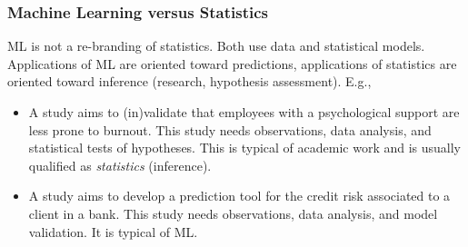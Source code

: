 \begin{frame}
\frametitle{Machine Learning versus Statistics}
ML is not a re-branding of statistics. Both use data and statistical models. Applications of ML are oriented toward predictions, applications of statistics are oriented toward inference (research, hypothesis assessment). E.g.,
\begin{itemize}
\item A study aims to (in)validate that employees with a psychological support are less prone to burnout. This study needs observations, data analysis, and statistical tests of hypotheses. This is typical of academic work and is usually qualified as {\it statistics} (inference).
\item A study aims to develop a prediction tool for the credit risk associated to a client in a bank. This study needs observations, data analysis, and model validation. It is typical of ML.
\end{itemize}
\end{frame}

